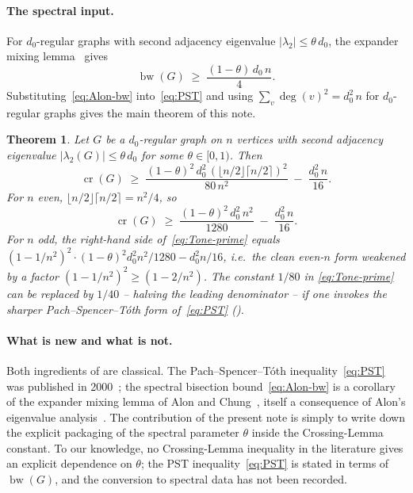 \documentclass[11pt,a4paper]{article}
\newtheorem{theorem}{Theorem}
\theoremstyle{definition}
\DeclareMathOperator{\crN}{cr}
\DeclareMathOperator{\bw}{bw}
\begin{document}
\paragraph{The spectral input.}
For $d_0$-regular graphs with second adjacency eigenvalue
$|\lambda_2| \le \theta\,d_0$, the expander mixing
lemma~\cite{Alon86, AlonChung} gives
\begin{equation}\label{eq:Alon-bw}
   \bw(G) \;\ge\; \frac{(1 - \theta)\,d_0\,n}{4}.
\end{equation}
Substituting~\eqref{eq:Alon-bw} into~\eqref{eq:PST} and using
$\sum_v \deg(v)^{2} = d_0^{2}\,n$ for $d_0$-regular graphs gives the
main theorem of this note.

\begin{theorem}\label{thm:main}
Let $G$ be a $d_0$-regular graph on $n$ vertices with second
adjacency eigenvalue $|\lambda_2(G)| \le \theta\,d_0$ for some
$\theta \in [0, 1)$. Then
\begin{equation}\label{eq:Tone-prime}
   \crN(G) \;\ge\;
     \frac{(1 - \theta)^{2}\,d_0^{2}\,(\lfloor n/2 \rfloor \lceil n/2 \rceil)^{2}}{80\,n^{2}}
     \;-\; \frac{d_0^{2}\,n}{16}.
\end{equation}
For $n$ even, $\lfloor n/2 \rfloor \lceil n/2 \rceil = n^{2}/4$, so
\[
   \crN(G) \;\ge\;
     \frac{(1 - \theta)^{2}\,d_0^{2}\,n^{2}}{1280}
     \;-\; \frac{d_0^{2}\,n}{16}.
\]
For $n$ odd, the right-hand side of~\eqref{eq:Tone-prime} equals
$(1 - 1/n^{2})^{2} \cdot (1 - \theta)^{2} d_0^{2} n^{2}/1280 - d_0^{2} n/16$,
i.e.\ the clean even-$n$ form weakened by a factor
$(1 - 1/n^{2})^{2} \ge (1 - 2/n^{2})$.
The constant $1/80$ in \eqref{eq:Tone-prime} can be replaced by
$1/40$ -- halving the leading denominator -- if one invokes the
sharper Pach--Spencer--T\'oth form of~\eqref{eq:PST}
().
\end{theorem}

\paragraph{What is new and what is not.}
Both ingredients of  are classical. The Pach--Spencer--T\'oth
inequality~\eqref{eq:PST} was published in 2000~\cite{PachSpencerToth}; the
spectral bisection bound~\eqref{eq:Alon-bw} is a corollary of the
expander mixing lemma of Alon and Chung~\cite{AlonChung}, itself a
consequence of Alon's eigenvalue analysis~\cite{Alon86}. The
contribution of the present note is simply to write down the
explicit packaging of the spectral parameter $\theta$ inside the
Crossing-Lemma constant. To our knowledge, no Crossing-Lemma
inequality in the literature gives an explicit dependence on
$\theta$; the PST inequality~\eqref{eq:PST} is stated in
terms of $\bw(G)$, and the conversion to spectral data has not been
recorded.
\end{document}
